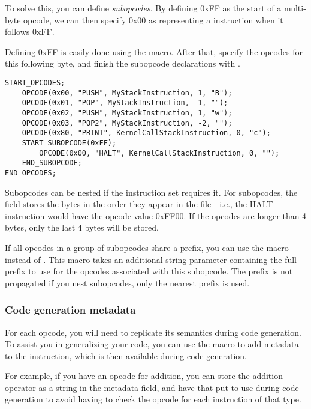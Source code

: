 To solve this, you can define \emph{subopcodes}. By defining 0xFF as the start of a multi-byte opcode, we can then specify 0x00 as representing a  instruction when it follows 0xFF.

Defining 0xFF is easily done using the  macro. After that, specify the opcodes for this following byte, and finish the subopcode declarations with .

\begin{C++}
\begin{lstlisting}
START_OPCODES;
	OPCODE(0x00, "PUSH", MyStackInstruction, 1, "B");
	OPCODE(0x01, "POP", MyStackInstruction, -1, "");
	OPCODE(0x02, "PUSH", MyStackInstruction, 1, "w");
	OPCODE(0x03, "POP2", MyStackInstruction, -2, "");
	OPCODE(0x80, "PRINT", KernelCallStackInstruction, 0, "c");
	START_SUBOPCODE(0xFF);
		OPCODE(0x00, "HALT", KernelCallStackInstruction, 0, "");
	END_SUBOPCODE;
END_OPCODES;
\end{lstlisting}
\end{C++}

Subopcodes can be nested if the instruction set requires it. For subopcodes, the  field stores the bytes in the order they appear in the file - i.e., the HALT instruction would have the opcode value 0xFF00. If the opcodes are longer than 4 bytes, only the last 4 bytes will be stored.

If all opcodes in a group of subopcodes share a prefix, you can use the  macro instead of . This macro takes an additional string parameter containing the full prefix to use for the opcodes associated with this subopcode. The prefix is not propagated if you nest subopcodes, only the nearest prefix is used.

\subsubsection{Code generation metadata}
For each opcode, you will need to replicate its semantics during code generation. To assist you in generalizing your code, you can use the  macro to add metadata to the instruction, which is then available during code generation.

For example, if you have an opcode for addition, you can store the addition operator as a string in the metadata field, and have that put to use during code generation to avoid having to check the opcode for each instruction of that type.

